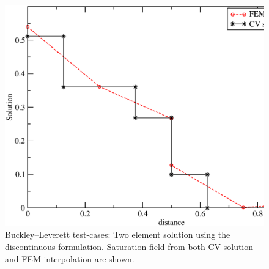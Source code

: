 \begin{figure}[h]
\begin{center}
\includegraphics[width=1.\textwidth]{diagrams/bl-dg-2eles.eps}
\end{center}
\caption{Buckley--Leverett test-cases: Two element solution using the discontinuous formulation. Saturation field from both CV solution and FEM interpolation are shown.  \label{bl-dg-2eles}}
\end{figure}


